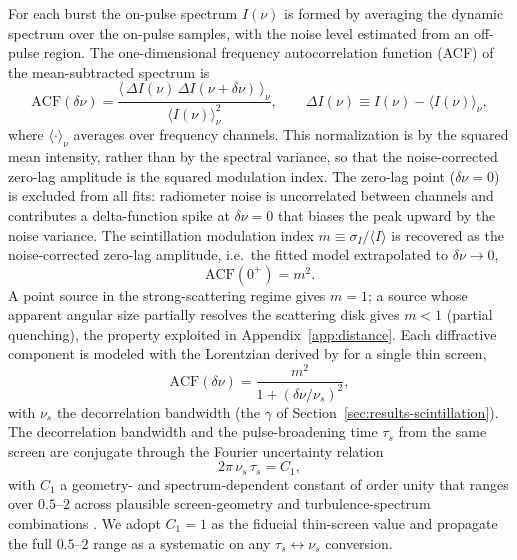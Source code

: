 For each burst the on-pulse spectrum $I(\nu)$ is formed by averaging the
dynamic spectrum over the on-pulse samples, with the noise level estimated
from an off-pulse region. The one-dimensional frequency autocorrelation
function (ACF) of the mean-subtracted spectrum is
%
\begin{equation}
\mathrm{ACF}(\delta\nu)
  = \frac{\big\langle\, \Delta I(\nu)\,\Delta I(\nu+\delta\nu)\,\big\rangle_\nu}
         {\big\langle I(\nu)\big\rangle_\nu^2},
\qquad
\Delta I(\nu) \equiv I(\nu) - \big\langle I(\nu)\big\rangle_\nu,
\label{eq:acf}
\end{equation}
%
where $\langle\cdot\rangle_\nu$ averages over frequency channels. This
normalization is by the squared mean intensity, rather than by the spectral
variance, so that the noise-corrected zero-lag amplitude is the squared
modulation index. The
zero-lag point ($\delta\nu=0$) is excluded from all fits: radiometer noise is
uncorrelated between channels and contributes a delta-function spike at
$\delta\nu=0$ that biases the peak upward by the noise variance. The
scintillation modulation index $m\equiv\sigma_I/\langle I\rangle$ is recovered
as the noise-corrected zero-lag amplitude, i.e.\ the fitted model extrapolated
to $\delta\nu\to0$,
%
\begin{equation}
\mathrm{ACF}(0^{+}) = m^{2}.
\label{eq:m2}
\end{equation}
%
A point source in the strong-scattering regime gives $m=1$; a source whose
apparent angular size partially resolves the scattering disk gives $m<1$
(partial quenching), the property exploited in Appendix~\ref{app:distance}.
Each diffractive component is modeled with the Lorentzian derived by
\citet{Gwinn1998} for a single thin screen,
%
\begin{equation}
\mathrm{ACF}(\delta\nu)
  = \frac{m^{2}}{1 + (\delta\nu/\nu_{s})^{2}},
\label{eq:lorentzian}
\end{equation}
%
with $\nu_{s}$ the decorrelation bandwidth (the $\gamma$ of
Section~\ref{sec:results-scintillation}). The decorrelation bandwidth and the
pulse-broadening time $\tau_{s}$ from the same screen are conjugate through
the Fourier uncertainty relation
%
\begin{equation}
2\pi\,\nu_{s}\,\tau_{s} = C_{1},
\label{eq:c1}
\end{equation}
%
with $C_{1}$ a geometry- and spectrum-dependent constant of order unity that
ranges over $0.5$--$2$ across plausible screen-geometry and turbulence-spectrum
combinations \citep{LambertRickett1999,Pradeep2025}. We adopt $C_{1}=1$ as the
fiducial thin-screen value and propagate the full $0.5$--$2$ range as a
systematic on any $\tau_{s}\leftrightarrow\nu_{s}$ conversion.

